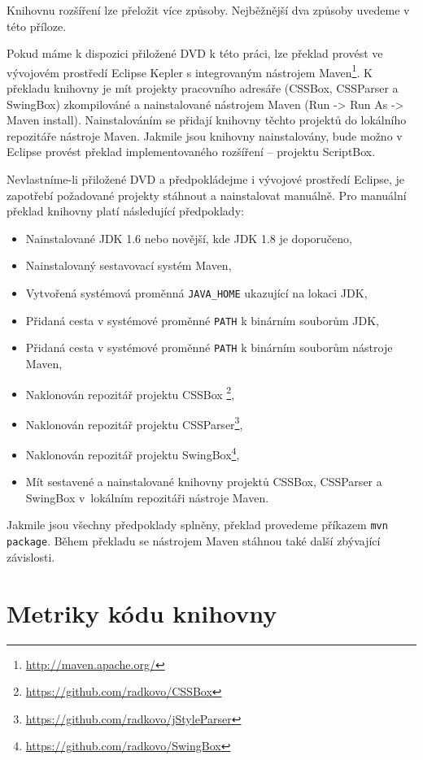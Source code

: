 Knihovnu rozšíření lze přeložit více způsoby. Nejběžnější dva způsoby uvedeme v této příloze.

Pokud máme k dispozici přiložené DVD k této práci, lze překlad provést ve vývojovém prostředí Eclipse Kepler s integrovaným nástrojem Maven\footnote{\url{http://maven.apache.org/}}. K překladu knihovny je mít projekty pracovního adresáře (CSSBox, CSSParser a SwingBox) zkompilováné a nainstalované nástrojem Maven (Run -> Run As -> Maven install). Nainstalováním se přidají knihovny těchto projektů do lokálního repozitáře nástroje Maven. Jakmile jsou knihovny nainstalovány, bude možno v Eclipse provést překlad implementovaného rozšíření -- projektu ScriptBox.

Nevlastníme-li přiložené DVD a předpokládejme i vývojové prostředí Eclipse, je zapotřebí požadované projekty stáhnout a nainstalovat manuálně. Pro manuální překlad knihovny platí následující předpoklady:

\begin{itemize}
  \item Nainstalované JDK 1.6 nebo novější, kde JDK 1.8 je doporučeno,
  \item Nainstalovaný sestavovací systém Maven,
  \item Vytvořená systémová proměnná \texttt{JAVA\_HOME} ukazující na lokaci JDK,
  \item Přidaná cesta v systémové proměnné \texttt{PATH} k binárním souborům JDK,
  \item Přidaná cesta v systémové proměnné \texttt{PATH} k binárním souborům nástroje Maven,
  \item Naklonován repozitář projektu CSSBox \footnote{\url{https://github.com/radkovo/CSSBox}},
  \item Naklonován repozitář projektu CSSParser\footnote{\url{https://github.com/radkovo/jStyleParser}},
  \item Naklonován repozitář projektu SwingBox\footnote{\url{https://github.com/radkovo/SwingBox}},
  \item Mít sestavené a nainstalované knihovny projektů CSSBox, CSSParser a SwingBox v~lokálním repozitáři nástroje Maven.
\end{itemize}

Jakmile jsou všechny předpoklady splněny, překlad provedeme příkazem \texttt{mvn package}. Během překladu se nástrojem Maven stáhnou také další zbývající závislosti. 

\chapter{Metriky kódu knihovny}
\label{Annex.metrics}

